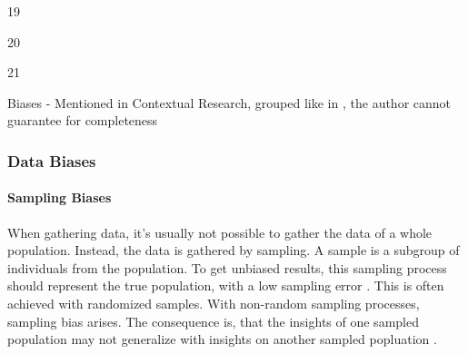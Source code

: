 \documentclass[12pt, a4paper, oneside]{book}   	%
\begin{document}
\begin{table}[H]
\begin{threeparttable}
\begin{tablenotes}
\begin{minipage}{0.33\textwidth}
							\item[19] \autocite{Chakraborty_2024}
							\item[20] \autocite{Young_2020}
							\item[21] \autocite{Montoya_2025}
						\end{minipage}%
					\end{tablenotes}
				\end{threeparttable}
				\caption{Biases - Mentioned in Contextual Research, grouped like in \cite{Mehrabi_2021}, the author cannot guarantee for completeness}
				\label{tab:biases_types}
			\end{table}
			
			\subsubsection{Data Biases}
				
				\paragraph{Sampling Biases}		
				When gathering data, it's usually not possible to gather the data of a whole population. Instead, the data is gathered by sampling. A sample is a subgroup of individuals from the population. To get unbiased results, this sampling process should represent the true population, with a low sampling error \autocites{HP_2022}. This is often achieved with randomized samples. With non-random sampling processes, sampling bias arises. The consequence is, that the insights of one sampled population may not generalize with insights on another sampled popluation \autocite{Mehrabi_2021}.
				
\end{document}
